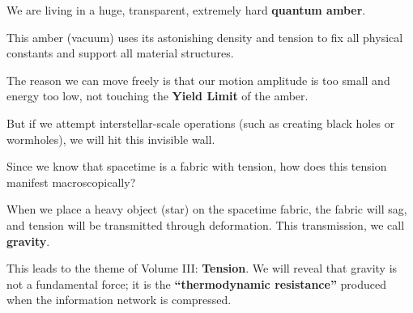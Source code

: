 We are living in a huge, transparent, extremely hard \textbf{quantum amber}.

This amber (vacuum) uses its astonishing density and tension to fix all physical constants and support all material structures.

The reason we can move freely is that our motion amplitude is too small and energy too low, not touching the \textbf{Yield Limit} of the amber.

But if we attempt interstellar-scale operations (such as creating black holes or wormholes), we will hit this invisible wall.

Since we know that spacetime is a fabric with tension, how does this tension manifest macroscopically?

When we place a heavy object (star) on the spacetime fabric, the fabric will sag, and tension will be transmitted through deformation. This transmission, we call \textbf{gravity}.

This leads to the theme of Volume III: \textbf{Tension}. We will reveal that gravity is not a fundamental force; it is the \textbf{``thermodynamic resistance''} produced when the information network is compressed.


